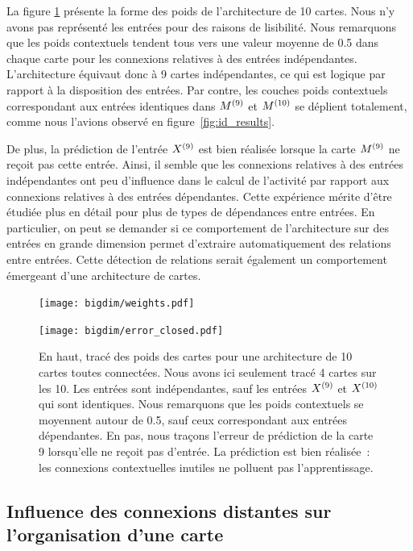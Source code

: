 \documentclass[../main]{subfiles}
\begin{document}
La figure \ref{fig:bigdim} présente la forme des poids de l'architecture de 10 cartes. Nous n'y avons pas représenté les entrées pour des raisons de lisibilité.
Nous remarquons que les poids contextuels tendent tous vers une valeur moyenne de 0.5 dans chaque carte pour les connexions relatives à des entrées indépendantes.
L'architecture équivaut donc à 9 cartes indépendantes, ce qui est logique par rapport à la disposition des entrées. Par contre, les couches poids contextuels correspondant aux entrées identiques dans $M^{({9})}$ et $M^{({10})}$ se déplient totalement, comme nous l'avions observé en figure~\ref{fig:id_results}.

De plus, la prédiction de l'entrée $X^{({9})}$ est bien réalisée lorsque la carte $M^{({9})}$ ne reçoit pas cette entrée. Ainsi, il semble que les connexions relatives à des entrées indépendantes ont peu d'influence dans le calcul de l'activité par rapport aux connexions relatives à des entrées dépendantes.
Cette expérience mérite d'être étudiée plus en détail pour plus de types de dépendances entre entrées. 
En particulier, on peut se demander si ce comportement de l'architecture sur des entrées en grande dimension permet d'extraire automatiquement des relations entre entrées. Cette détection de relations serait également un comportement émergeant d'une architecture de cartes.

\begin{figure}[h!]
	\begin{minipage}{\textwidth}
	\texttt{[image: bigdim/weights.pdf]}
	\end{minipage}
\begin{minipage}{\textwidth}
	\centering\texttt{[image: bigdim/error\_closed.pdf]}
	\caption{En haut, tracé des poids des cartes pour une architecture de 10 cartes toutes connectées. Nous avons ici seulement tracé 4 cartes sur les 10. Les entrées sont indépendantes, sauf les entrées $X^{({9})}$ et $X^{({10})}$ qui sont identiques. Nous remarquons que les poids contextuels se moyennent autour de 0.5, sauf ceux correspondant aux entrées dépendantes. En pas, nous traçons l'erreur de prédiction de la carte 9 lorsqu'elle ne reçoit pas d'entrée. La prédiction est bien réalisée~: les connexions contextuelles inutiles ne polluent pas l'apprentissage. \label{fig:bigdim}}
\end{minipage}
\end{figure}

\subsection{Influence des connexions distantes sur l'organisation d'une carte}
\end{document}
